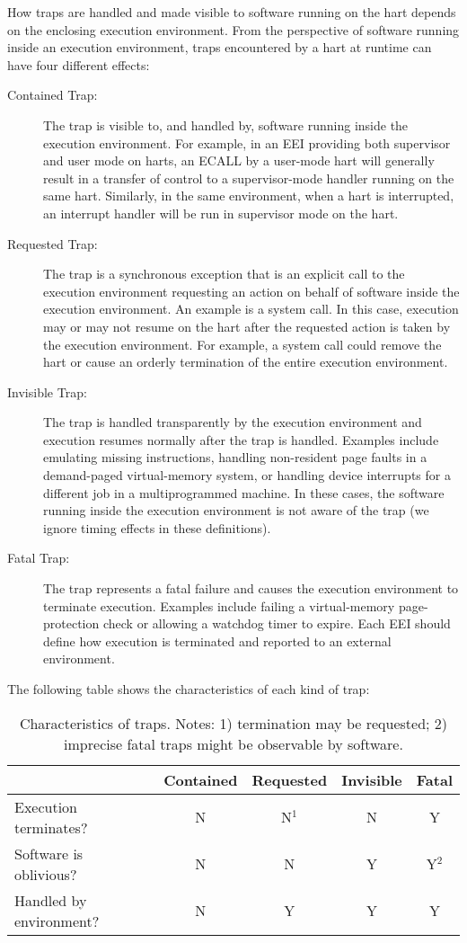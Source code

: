 How traps are handled and made visible to software running on the hart
depends on the enclosing execution environment.  From the perspective
of software running inside an execution environment, traps encountered
by a hart at runtime can have four different effects:
\begin{description}
  \item[Contained Trap:] The trap is visible to, and handled by,
    software running inside the execution environment.  For example,
    in an EEI providing both supervisor and user
    mode on harts, an ECALL by a user-mode hart will generally result
    in a transfer of control to a supervisor-mode handler running on
    the same hart.  Similarly, in the same environment, when a hart is
    interrupted, an interrupt handler will be run in supervisor mode
    on the hart.
  \item[Requested Trap:] The trap is a synchronous exception that is
    an explicit call to the execution environment requesting an action
    on behalf of software inside the execution environment.  An
    example is a system call.  In this case, execution may or may not
    resume on the hart after the requested action is taken by the
    execution environment.  For example, a system call could remove the
    hart or cause an orderly termination of the entire execution environment.
  \item[Invisible Trap:] The trap is handled transparently by the
    execution environment and execution resumes normally after the
    trap is handled.  Examples include emulating missing instructions,
    handling non-resident page faults in a demand-paged virtual-memory
    system, or handling device interrupts for a different job in a
    multiprogrammed machine.  In these cases, the software running
    inside the execution environment is not aware of the trap (we
    ignore timing effects in these definitions).
  \item[Fatal Trap:] The trap represents a fatal failure and causes
    the execution environment to terminate execution.  Examples
    include failing a virtual-memory page-protection check or allowing
    a watchdog timer to expire.  Each EEI should define how execution
    is terminated and reported to an external environment.
\end{description}

The following table shows the characteristics of each kind of trap:

\begin{table}[hbt]
  \centering
  \begin{tabular}{|l|c|c|c|c|}
      \hline
      & Contained & Requested & Invisible & Fatal\\
      \hline
      Execution terminates? & N & N$^{1}$ & N & Y \\
      Software is oblivious? & N & N & Y & Y$^{2}$ \\
      Handled by environment? & N & Y & Y & Y \\
      \hline
  \end{tabular}
  \caption{Characteristics of traps. Notes: 1) termination may be
    requested; 2) imprecise fatal traps might be observable by software.}
\end{table}

